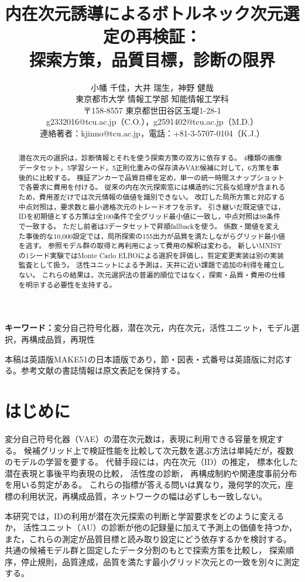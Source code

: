 \documentclass[11pt,a4paper]{ltjsarticle}
\title{内在次元誘導によるボトルネック次元選定の再検証：\\探索方策，品質目標，診断の限界}
\author{小幡 千佳，大井 瑞生，神野 健哉\\
東京都市大学 情報工学部 知能情報工学科\\
{\small 〒158-8557 東京都世田谷区玉堤1-28-1}\\
{\small g2332016@tcu.ac.jp（C.O.），g2591402@tcu.ac.jp（M.D.）}\\
{\small 連絡著者：kjinno@tcu.ac.jp，電話：+81-3-5707-0104（K.J.）}}
\date{}
\begin{document}
\maketitle
\begin{abstract}
潜在次元の選択は，診断情報とそれを使う探索方策の双方に依存する。
4種類の画像データセット，5学習シード，5正則化重みの保存済みVAE候補に対して，6方策を事後的に比較する。
検証アンカーで品質目標を定め，単一の統一時間スナップショットで各要求に費用を付ける。
従来の内在次元探索窓には構造的に冗長な処理が含まれるため，費用差だけでは次元情報の価値を識別できない。
改訂した局所方策と対応する中点対照は，要求数と最小適格次元のトレードオフを示す。
引き継いだ既定値では，IDを初期値とする方策は全100条件で全グリッド最小値に一致し，中点対照は98条件で一致する。
ただし前者は3データセットで昇順fallbackを使う。
係数・閾値を変えた事後的な10,000設定では，局所探索の155出力が品質を満たしながらグリッド最小値を逃す。
参照モデル群の取得と再利用によって費用の解釈は変わる。
新しいMNISTの1シード実験ではMonte Carlo ELBOによる選択を評価し，剪定変更実装は別の実装監査として扱う。
活性ユニットによる予測は，天井に近い課題で追加の利得を確立しない。
これらの結果は，次元選択法の普遍的順位ではなく，探索・品質・費用の仕様を明示する必要性を支持する。
\end{abstract}
\noindent\textbf{キーワード：}変分自己符号化器，潜在次元，内在次元，活性ユニット，モデル選択，再構成品質，再現性
\par\smallskip
{\small 本稿は英語版MAKE51の日本語版であり，節・図表・式番号は英語版に対応する。参考文献の書誌情報は原文表記を保持する。}
\par\medskip
\section{はじめに}\label{sec:intro}

変分自己符号化器（VAE）\cite{kingma2014vae}の潜在次元数は，表現に利用できる容量を規定する。
候補グリッド上で検証性能を比較して次元数を選ぶ方法は単純だが，複数のモデルの学習を要する。
代替手段には，内在次元（ID）の推定\cite{facco2017twonn,levina2005mle}，
標本化した潜在表現と事後平均表現の比較\cite{bonheme2022fondue}，
活性度の診断\cite{burda2016iwae,bonheme2023active}，
再構成制約や関連度事前分布を用いる剪定\cite{deboom2020geco,saha2025ardvae}がある。
これらの指標が答える問いは異なり，幾何学的次元，座標の利用状況，再構成品質，ネットワークの幅は必ずしも一致しない。

本研究では，IDの利用が潜在次元探索の判断と学習要求をどのように変えるか，
活性ユニット（AU）の診断が他の記録量に加えて予測上の価値を持つか，
また，これらの測定が品質目標と読み取り設定にどう依存するかを検討する。
共通の候補モデル群と固定したデータ分割のもとで探索方策を比較し，
探索順序，停止規則，品質達成，品質を満たす最小グリッド次元との一致を別々に測定する。
\end{document}
